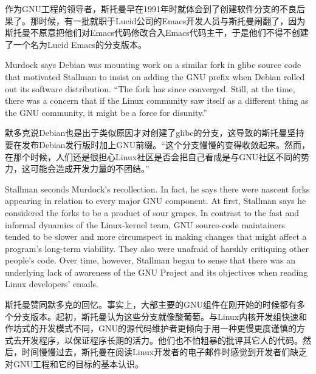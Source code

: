 \ifdefined\chs
作为GNU工程的领导者，斯托曼早在1991年时就体会到了创建软件分支的不良后果了。那时候，有一批就职于Lucid公司的Emacs开发人员与斯托曼闹翻了，因为斯托曼不原意把他们对Emacs代码修改合入Emacs代码主干，于是他们不得不创建了一个名为Lucid Emacs的分支版本。
\fi

\ifdefined\eng
Murdock says Debian was mounting work on a similar fork in glibc source code that motivated Stallman to insist on adding the GNU prefix when Debian rolled out its software distribution. ``The fork has since converged. Still, at the time, there was a concern that if the Linux community saw itself as a different thing as the GNU community, it might be a force for disunity.''
\fi

\ifdefined\chs
默多克说Debian也是出于类似原因才对创建了glibc的分支，这导致的斯托曼坚持要在发布Debian发行版时加上GNU前缀。``这个分支慢慢的变得收敛起来。然而，在那个时候，人们还是很担心Linux社区是否会把自己看成是与GNU社区不同的势力，这可能会造成开发力量的不团结。''
\fi

\ifdefined\eng
Stallman seconds Murdock's recollection. In fact, he says there were nascent forks appearing in relation to every major GNU component. At first, Stallman says he considered the forks to be a product of sour grapes. In contrast to the fast and informal dynamics of the Linux-kernel team, GNU source-code maintainers tended to be slower and more circumspect in making changes that might affect a program's long-term viability. They also were unafraid of harshly critiquing other people's code. Over time, however, Stallman began to sense that there was an underlying lack of awareness of the GNU Project and its objectives when reading Linux developers' emails.
\fi

\ifdefined\chs
斯托曼赞同默多克的回忆。事实上，大部主要的GNU组件在刚开始的时候都有多个分支版本。起初，斯托曼认为这些分支就像酸葡萄。与Linux内核开发组快速和作坊式的开发模式不同，GNU的源代码维护者更倾向于用一种更慢更度谨慎的方式去开发程序，以保证程序长期的活力。他们也不怕粗暴的批评其它人的代码。然后，时间慢慢过去，斯托曼在阅读Linux开发者的电子邮件时感觉到开发者们缺乏对GNU工程和它的目标的基本认识。
\fi


